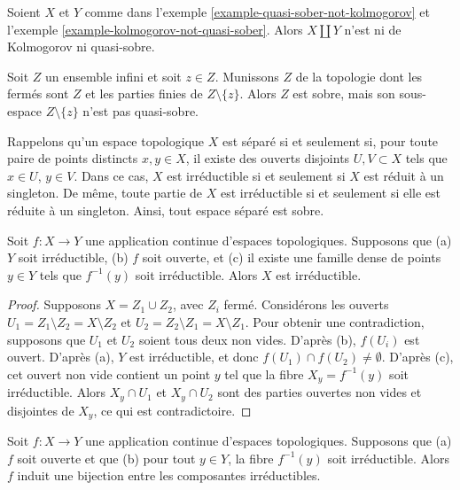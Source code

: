 \begin{example}
\label{example-not-kolmogorov-not-quasi-sober}
Soient $X$ et $Y$ comme dans l'exemple
\ref{example-quasi-sober-not-kolmogorov} et l'exemple
\ref{example-kolmogorov-not-quasi-sober}. Alors $X\amalg Y$ n'est ni de
Kolmogorov ni quasi-sobre.
\end{example}

\begin{example}
\label{example-sober-subspace}
Soit $Z$ un ensemble infini et soit $z\in Z$. Munissons $Z$ de la topologie
dont les fermés sont $Z$ et les parties finies de $Z\setminus\{z\}$. Alors $Z$
est sobre, mais son sous-espace $Z\setminus\{z\}$ n'est pas quasi-sobre.
\end{example}

\begin{example}
\label{example-Hausdorff}
Rappelons qu'un espace topologique $X$ est séparé si et seulement si, pour
toute paire de points distincts $x, y \in X$, il existe des ouverts disjoints
$U, V \subset X$ tels que $x \in U$, $y \in V$. Dans ce cas, $X$ est
irréductible si et seulement si $X$ est réduit à un singleton. De même, toute
partie de $X$ est irréductible si et seulement si elle est réduite à un
singleton. Ainsi, tout espace séparé est sobre.
\end{example}

\begin{lemma}
\label{lemma-irreducible-on-top}
Soit $f : X \to Y$ une application continue d'espaces topologiques.
Supposons que
(a) $Y$ soit irréductible,
(b) $f$ soit ouverte, et
(c) il existe une famille dense de points $y \in Y$ tels que
$f^{-1}(y)$ soit irréductible.
Alors $X$ est irréductible.
\end{lemma}

\begin{proof}
Supposons $X = Z_1 \cup Z_2$, avec $Z_i$ fermé.
Considérons les ouverts $U_1 = Z_1 \setminus Z_2 = X \setminus Z_2$ et
$U_2 = Z_2 \setminus Z_1 = X \setminus Z_1$. Pour obtenir une contradiction,
supposons que $U_1$ et $U_2$ soient tous deux non vides. D'après (b),
$f(U_i)$ est ouvert. D'après (a), $Y$ est irréductible, et donc
$f(U_1) \cap f(U_2) \not = \emptyset$. D'après (c), cet ouvert non vide
contient un point $y$ tel que la fibre
$X_y = f^{-1}(y)$ soit irréductible. Alors $X_y \cap U_1$ et
$X_y \cap U_2$ sont des parties ouvertes non vides et disjointes de $X_y$,
ce qui est contradictoire.
\end{proof}

\begin{lemma}
\label{lemma-irreducible-fibres-irreducible-components}
Soit $f : X \to Y$ une application continue d'espaces topologiques.
Supposons que (a) $f$ soit ouverte et que
(b) pour tout $y \in Y$, la fibre $f^{-1}(y)$ soit irréductible.
Alors $f$ induit une bijection entre les composantes irréductibles.
\end{lemma}


